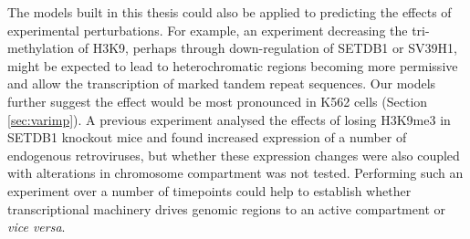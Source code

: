 \documentclass[a4paper,11pt,oneside]{book}
\begin{document}
The models built in this thesis could also be applied to predicting the effects of experimental perturbations. For example, an experiment decreasing the tri-methylation of H3K9, perhaps through down-regulation of SETDB1 or SV39H1, might be expected to lead to heterochromatic regions becoming more permissive and allow the transcription of marked tandem repeat sequences.\cite{Kim2012}  Our models further suggest the effect would be most pronounced in K562 cells (Section \ref{sec:varimp}). A previous experiment analysed the effects of losing H3K9me3 in SETDB1 knockout mice and found increased expression of a number of endogenous retroviruses,\cite{Karimi2011} but whether these expression changes were also coupled with alterations in chromosome compartment was not tested. Performing such an experiment over a number of timepoints could help to establish whether transcriptional machinery drives genomic regions to an active compartment or \emph{vice versa}.

%
%

\end{document}
